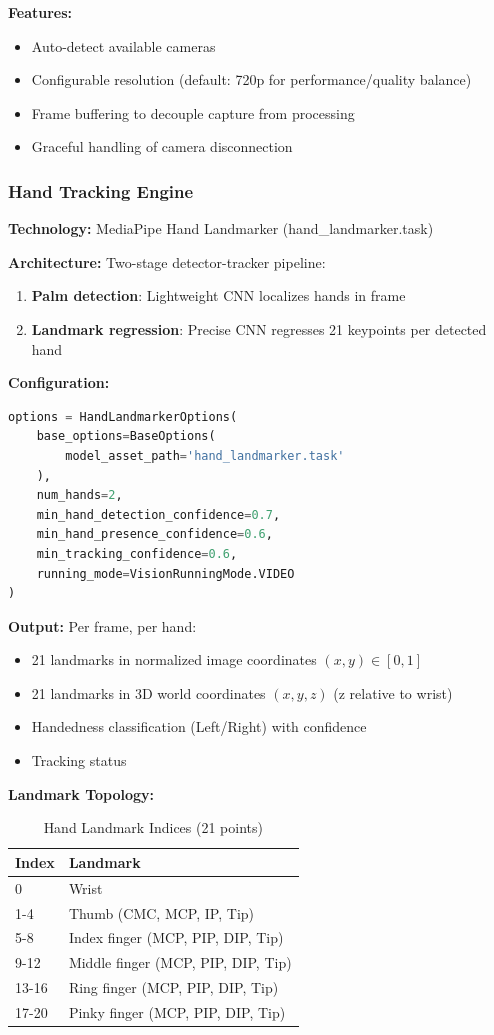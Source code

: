 \documentclass[11pt,a4paper]{article}
\begin{document}
\textbf{Features:}
\begin{itemize}
\item Auto-detect available cameras
\item Configurable resolution (default: 720p for performance/quality balance)
\item Frame buffering to decouple capture from processing
\item Graceful handling of camera disconnection
\end{itemize}

\subsubsection{Hand Tracking Engine}

\textbf{Technology:} MediaPipe Hand Landmarker (hand\_landmarker.task)

\textbf{Architecture:} Two-stage detector-tracker pipeline:
\begin{enumerate}
\item \textbf{Palm detection}: Lightweight CNN localizes hands in frame
\item \textbf{Landmark regression}: Precise CNN regresses 21 keypoints per detected hand
\end{enumerate}

\textbf{Configuration:}
\begin{lstlisting}[language=Python]
options = HandLandmarkerOptions(
    base_options=BaseOptions(
        model_asset_path='hand_landmarker.task'
    ),
    num_hands=2,
    min_hand_detection_confidence=0.7,
    min_hand_presence_confidence=0.6,
    min_tracking_confidence=0.6,
    running_mode=VisionRunningMode.VIDEO
)
\end{lstlisting}

\textbf{Output:} Per frame, per hand:
\begin{itemize}
\item 21 landmarks in normalized image coordinates $(x, y) \in [0,1]$
\item 21 landmarks in 3D world coordinates $(x, y, z)$ (z relative to wrist)
\item Handedness classification (Left/Right) with confidence
\item Tracking status
\end{itemize}

\textbf{Landmark Topology:}
\begin{table}[H]
\centering
\small
\begin{tabular}{@{}ll@{}}
\toprule
\textbf{Index} & \textbf{Landmark} \\
\midrule
0 & Wrist \\
1-4 & Thumb (CMC, MCP, IP, Tip) \\
5-8 & Index finger (MCP, PIP, DIP, Tip) \\
9-12 & Middle finger (MCP, PIP, DIP, Tip) \\
13-16 & Ring finger (MCP, PIP, DIP, Tip) \\
17-20 & Pinky finger (MCP, PIP, DIP, Tip) \\
\bottomrule
\end{tabular}
\caption{Hand Landmark Indices (21 points)}
\end{table}
\end{document}
